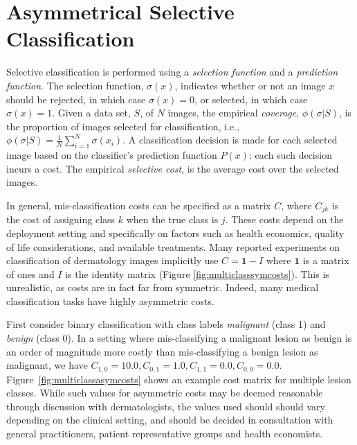 \section{Asymmetrical Selective Classification}
\label{sec:selective_classification}
Selective classification is performed using a {\em selection function} and a {\em prediction function}. The selection function, $\sigma(x)$, indicates whether or not an image $x$ should be rejected, in which case $\sigma(x)=0$, or selected, in which case $\sigma(x)=1$. Given a data set, $S$, of $N$ images, the empirical {\em coverage}, $\phi(\sigma|S)$, is the proportion of images selected for classification, i.e.,  $\phi(\sigma|S) = \frac{1}{N} \sum_{i=1}^{N} \sigma(x_i)$. A classification decision is made for each selected image based on the classifier's prediction function $P(x)$; each such decision incurs a cost. The empirical {\em selective cost}, is the average cost over the selected images.

In general, mis-classification costs can be specified as a matrix $C$, where $C_{jk}$ is the cost of assigning class $k$ when the true class is $j$. These costs depend on the deployment setting and specifically on factors such as health economics, quality of life considerations, and available treatments. Many reported experiments on classification of dermatology images implicitly use $C = \mathbf{1} - I$ where $\mathbf{1}$ is a matrix of ones and $I$ is the identity matrix (Figure \ref{fig:multiclasssymcosts}). This is unrealistic, as costs are in fact far from symmetric. Indeed, many medical classification tasks have highly asymmetric costs.

First consider binary classification with class labels {\em malignant} (class 1) and {\em benign} (class 0). In a setting where mis-classifying a malignant lesion as benign is an order of magnitude more costly than mis-classifying a benign lesion as malignant, we have $C_{1,0} = 10.0, C_{0,1} = 1.0, C_{1,1} = 0.0, C_{0,0} = 0.0$. Figure~\ref{fig:multiclassasymcosts} shows an example cost matrix for multiple lesion classes. While such values for asymmetric costs may be deemed reasonable through discussion with dermatologists, the values used should should vary depending on the clinical setting, and should be decided in consultation with general practitioners, patient representative groups and health economists.

